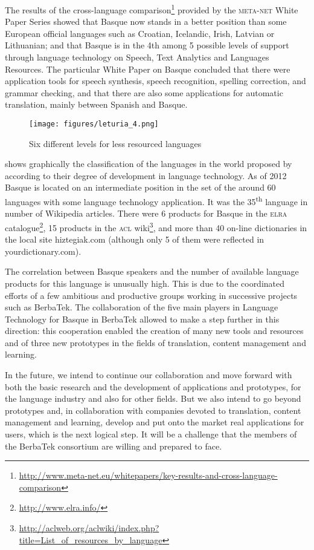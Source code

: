 \documentclass[output=paper]{LSP/langsci}
\begin{document}
The results of the cross-language comparison\footnote{\url{http://www.meta-net.eu/whitepapers/key-results-and-cross-language-comparison}} provided by the \textsc{meta-net} White Paper Series showed that Basque now stands in a better position than some European official languages such as Croatian, Icelandic, Irish, Latvian or Lithuanian; and that Basque is in the 4th among 5 possible levels of support through language technology on Speech, Text Analytics and Languages Resources. The particular White Paper on Basque \citep{HernáezEtAl2012} concluded that there were application tools for speech synthesis, speech recognition, spelling correction, and grammar checking, and that there are also some applications for automatic translation, mainly between Spanish and Basque.

\begin{figure}[h]
\texttt{[image: figures/leturia\_4.png]}
\caption{Six different levels for less resourced languages}
\label{fig:leturia:4}
\end{figure} 

 shows graphically the classification of the languages in the world  proposed by \citet{AlegriaEtAl2011} according to their degree of development in language technology. As of 2012 Basque is located on an intermediate position in the set of the around 60 languages with some language technology application. It was the 35\textsuperscript{th} language in number of Wikipedia articles. There were 6 products for Basque in the \textsc{elra} catalogue\footnote{\url{http://www.elra.info/}}, 15 products in the \textsc{acl} wiki\footnote{\url{http://aclweb.org/aclwiki/index.php? title=List\_of\_resources\_by\_language}}, and more than 40 on-line dictionaries in the local site hiztegiak.com (although only 5 of them were reflected in yourdictionary.com).

The correlation between Basque speakers and the number of available language products for this language is unusually high. This is due to the coordinated efforts of a few ambitious and productive groups working in successive projects such as BerbaTek. The collaboration of the five main players in Language Technology for Basque in BerbaTek allowed to make a step further in this direction: this cooperation enabled the creation of many new tools and resources and of three new prototypes in the fields of translation, content management and learning.

In the future, we intend to continue our collaboration and move forward with both the basic research and the development of applications and prototypes, for the language industry and also for other fields. But we also intend to go beyond prototypes and, in collaboration with companies devoted to translation, content management and learning, develop and put onto the market real applications for users, which is the next logical step. It will be a challenge that the members of the BerbaTek consortium are willing and prepared to face.
\end{document}
